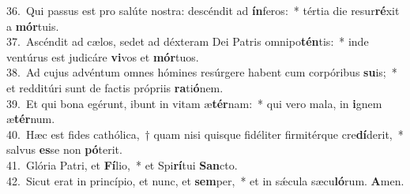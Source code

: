 {36.~}Qui passus est pro salúte nostra: descéndit ad \textbf{ín}feros:~* tértia die resur\textbf{ré}xit a \textbf{mór}tuis.\\
{37.~}Ascéndit ad cælos, sedet ad déxteram Dei Patris omnipo\textbf{tén}tis:~* inde ventúrus est judicáre \textbf{vi}vos et \textbf{mór}tuos.\\
{38.~}Ad cujus advéntum omnes hómines resúrgere habent cum corpóribus \textbf{su}is;~* et redditúri sunt de factis própriis \textbf{ra}ti\textbf{ó}nem.\\
{39.~}Et qui bona egérunt, ibunt in vitam æ\textbf{tér}nam:~* qui vero mala, in \textbf{i}gnem æ\textbf{tér}num.\\
{40.~}Hæc est fides cathólica,~† quam nisi quisque fidéliter firmitérque cre\textbf{dí}derit,~* salvus \textbf{es}se non \textbf{pó}terit.\\
{41.~}Glória Patri, et \textbf{Fí}lio,~* et Spi\textbf{rí}tui \textbf{San}cto.\\
{42.~}Sicut erat in princípio, et nunc, et \textbf{sem}per,~* et in sǽcula sæcu\textbf{ló}rum. \textbf{A}men.\\
